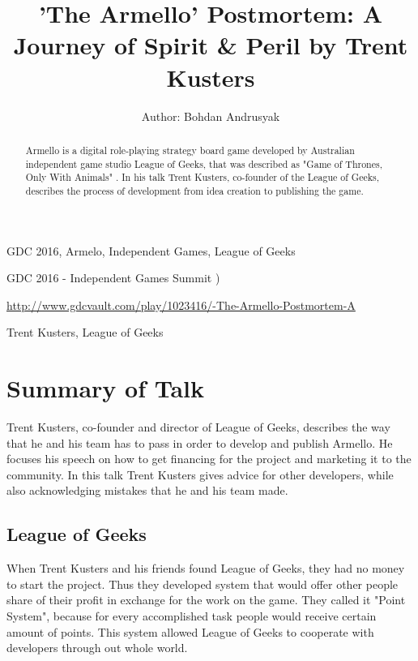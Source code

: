 \documentclass[a4paper]{article}
\title{'The Armello' Postmortem: A Journey of Spirit \& Peril by Trent Kusters}
\author{Author: Bohdan Andrusyak}
\begin{document}
\maketitle

\begin{keywords} GDC 2016, Armelo, Independent Games, League of Geeks \end{keywords}

\begin{track} GDC 2016 - Independent Games Summit ) \end{track}

\begin{talkurl}  \url{http://www.gdcvault.com/play/1023416/-The-Armello-Postmortem-A} \end{talkurl}

\begin{speaker}Trent Kusters, League of Geeks \end{speaker}


\begin{abstract}
Armello is a digital role-playing strategy board game developed by Australian independent game studio League of Geeks, that was described as "Game of Thrones, Only With Animals" \cite{kotaku}. In his talk Trent Kusters, co-founder of the League of Geeks, describes the process of development from idea creation to publishing the game.  

\end{abstract}

\section{Summary of Talk}
Trent Kusters, co-founder and director of League of Geeks, describes the way that he and his team has to pass in order to develop and publish Armello. He focuses his speech on how to get financing for the project and marketing it to the community. In this talk Trent Kusters gives advice for other developers, while also acknowledging mistakes that he and his team made. 

\subsection{League of Geeks}
When Trent Kusters and his friends found League of Geeks, they had no money to start the project. Thus they developed system that would offer other people share of their profit in exchange for the work on the game. They called it "Point System", because for every accomplished task people would receive certain amount of points. This system allowed League of Geeks to cooperate with developers through out whole world. 
\end{document}
